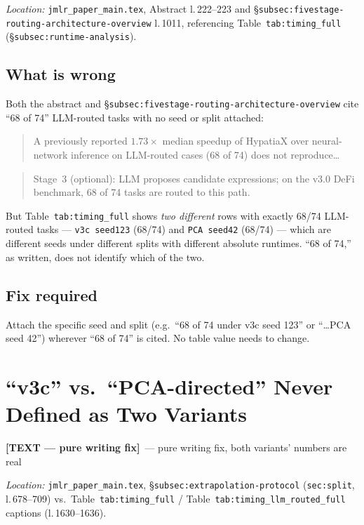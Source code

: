 \documentclass[11pt]{article}
\newcommand{\textfix}{\textcolor{green!40!black}{\textbf{[TEXT --- pure writing fix]}}}
\newcommand{\loc}[1]{\textit{Location:} #1\par}
\newenvironment{evidence}
  {\begin{quote}\small\ttfamily}
  {\end{quote}}
\begin{document}
\loc{\texttt{jmlr\_paper\_main.tex}, Abstract l.\,222--223 and
\S\texttt{subsec:fivestage-routing-architecture-overview} l.\,1011,
referencing Table~\texttt{tab:timing\_full} (\S\texttt{subsec:runtime-analysis}).}

\subsection*{What is wrong}
Both the abstract and \S\texttt{subsec:fivestage-routing-architecture-overview}
cite ``68 of 74'' LLM-routed tasks with no seed or split attached:
\begin{evidence}
A previously reported $1.73\times$ median speedup of HypatiaX over
neural-network inference on LLM-routed cases (68 of 74) does not reproduce\ldots
\end{evidence}
\begin{evidence}
Stage~3 (optional): LLM proposes candidate expressions; on the v3.0 DeFi
benchmark, 68 of 74 tasks are routed to this path.
\end{evidence}
But Table~\texttt{tab:timing\_full} shows \emph{two different} rows with exactly
68/74 LLM-routed tasks --- \texttt{v3c seed123} (68/74) and \texttt{PCA
seed42} (68/74) --- which are different seeds under different splits with
different absolute runtimes. ``68 of 74,'' as written, does not identify
which of the two.

\subsection*{Fix required}
Attach the specific seed and split (e.g.\ ``68 of 74 under v3c seed 123'' or
``\ldots PCA seed 42'') wherever ``68 of 74'' is cited. No table value needs
to change.

\section{``v3c'' vs.\ ``PCA-directed'' Never Defined as Two Variants}
\label{issue:6}
\textfix\ --- pure writing fix, both variants' numbers are real

\loc{\texttt{jmlr\_paper\_main.tex}, \S\texttt{subsec:extrapolation-protocol}
(\texttt{sec:split}, l.\,678--709) vs.\ Table~\texttt{tab:timing\_full} /
Table~\texttt{tab:timing\_llm\_routed\_full} captions (l.\,1630--1636).}
\end{document}

